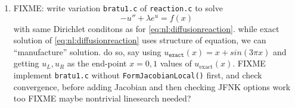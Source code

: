 \begin{enumerate}
\item FIXME: write variation \texttt{bratu1.c} of \texttt{reaction.c} to solve
    $$-u'' + \lambda e^u = f(x)$$
with same Dirichlet conditons as for \eqref{eq:nl:diffusionreaction}.  while exact solution of \eqref{eq:nl:diffusionreaction} uses structure of equation, we can ``manufacture'' solution.  do so, say using $u_{\texttt{exact}}(x)=x + sin(3\pi x)$ and getting $u_L,u_R$ as the end-point $x=0,1$ values of $u_{\text{exact}}(x)$.  FIXME implement \texttt{bratu1.c} without \texttt{FormJacobianLocal()} first, and check convergence, before adding Jacobian and then checking JFNK options work too  FIXME maybe nontrivial linesearch needed?
\end{enumerate}